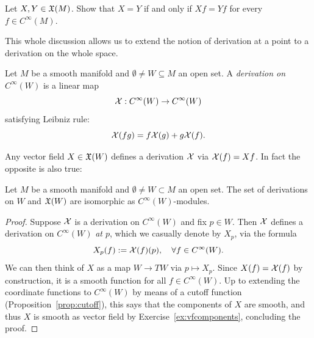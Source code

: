 \begin{exercise}
	Let $X,Y\in\mathfrak{X}(M)$.
	Show that $X=Y$ if and only if $Xf = Yf$ for every $f\in C^\infty(M)$.
\end{exercise}

This whole discussion allows us to extend the notion of derivation at a point to a derivation on the whole space.
\begin{definition}
	Let $M$ be a smooth manifold and $\emptyset\neq W\subseteq M$ an open set.
	A \emph{derivation on $C^\infty(W)$} is a linear map
	\begin{equation}
		\mathcal{X}:C^\infty(W)\to C^\infty(W)
	\end{equation}
	satisfying Leibniz rule:
	\begin{equation}
		\mathcal{X}(fg) = f \mathcal{X}(g) + g \mathcal{X}(f).
	\end{equation}
\end{definition}

Any vector field $X\in\mathfrak{X}(W)$ defines a derivation $\mathcal{X}$ via $\mathcal{X}(f) = Xf$. In fact the opposite is also true:
\begin{proposition}\label{prop:vfderivationiso}
	Let $M$ be a smooth manifold and $\emptyset\neq W\subset M$ an open set.
	The set of derivations on $W$ and $\mathfrak{X}(W)$ are isomorphic as $C^\infty(W)$-modules.
\end{proposition}
\begin{proof}
	Suppose $\mathcal{X}$ is a derivation on $C^\infty(W)$ and fix $p\in W$. Then $\mathcal{X}$ defines a derivation on $C^\infty(W)$ \emph{at $p$}, which we casually denote by $X_p$, via the formula
	\begin{equation}
		X_p(f) := \mathcal{X}(f)(p), \quad\forall f\in C^\infty(W).
	\end{equation}
	We can then think of $X$ as a map $W\to TW$ via $p\mapsto X_p$.
	Since $X(f)=\mathcal{X}(f)$ by construction, it is a smooth function for all $f\in C^\infty(W)$. Up to extending the coordinate functions to $C^\infty(W)$ by means of a cutoff function (Proposition~\ref{prop:cutoff}), this says that the components of $X$ are smooth, and thus $X$ is smooth as vector field by Exercise~\ref{ex:vfcomponents}, concluding the proof.
\end{proof}

